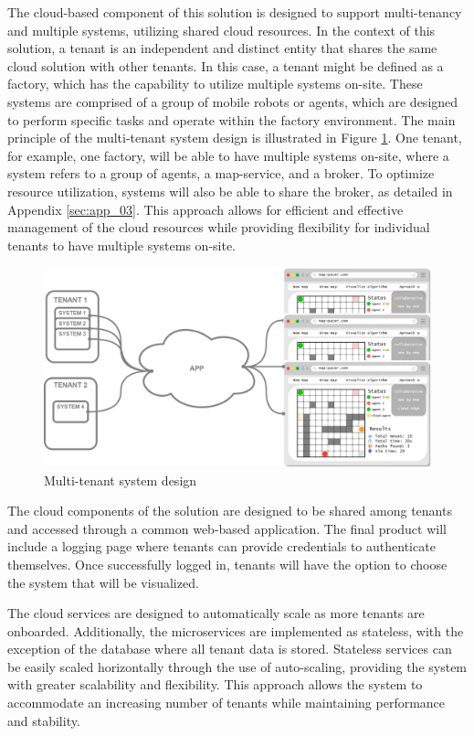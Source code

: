 The cloud-based component of this solution is designed to support multi-tenancy and multiple systems, utilizing shared cloud resources.  In the context of this solution, a tenant is an independent and distinct entity that shares the same cloud solution with other tenants. In this case, a tenant might be  defined as a factory, which has the capability to utilize multiple systems on-site. These systems are comprised of a group of mobile robots or agents, which are designed to perform specific tasks and operate within the factory environment. The main principle of the multi-tenant system design is illustrated in Figure \ref{fig:multi_tenant_simple}. One tenant, for example, one factory, will be able to have multiple systems on-site, where a system refers to a group of agents, a map-service, and a broker. To optimize resource utilization, systems will also be able to share the broker, as detailed in Appendix \ref{sec:app_03}. This approach allows for efficient and effective management of the cloud resources while providing flexibility for individual tenants to have multiple systems on-site.

\begin{figure}[H]
    \centering
    \includegraphics[width=\textwidth]{pictures/multi_tenant_simple.png}
    \caption{Multi-tenant system design}
    \label{fig:multi_tenant_simple}
\end{figure}

The cloud components of the solution are designed to be shared among tenants and accessed through a common web-based application. The final product will include a logging page where tenants can provide credentials to authenticate themselves. Once successfully logged in, tenants will have the option to choose the system that will be visualized.

The cloud services are designed to automatically scale as more tenants are onboarded. Additionally, the microservices are implemented as stateless, with the exception of the database where all tenant data is stored. Stateless services can be easily scaled horizontally through the use of auto-scaling, providing the system with greater scalability and flexibility. This approach allows the system to accommodate an increasing number of tenants while maintaining performance and stability.